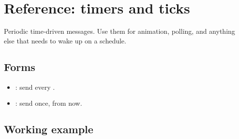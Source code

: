 \chapter{Reference: timers and ticks}
\label{ch:refman-timers}

\begin{aside}
Periodic time-driven messages. Use them for animation,
polling, and anything else that needs to wake up on a
schedule.
\end{aside}

\section{Forms}

\begin{itemize}[leftmargin=*]
  \item {}: send 
    every .
  \item {}: send
     once,  from now.
\end{itemize}

\section{Working example}

